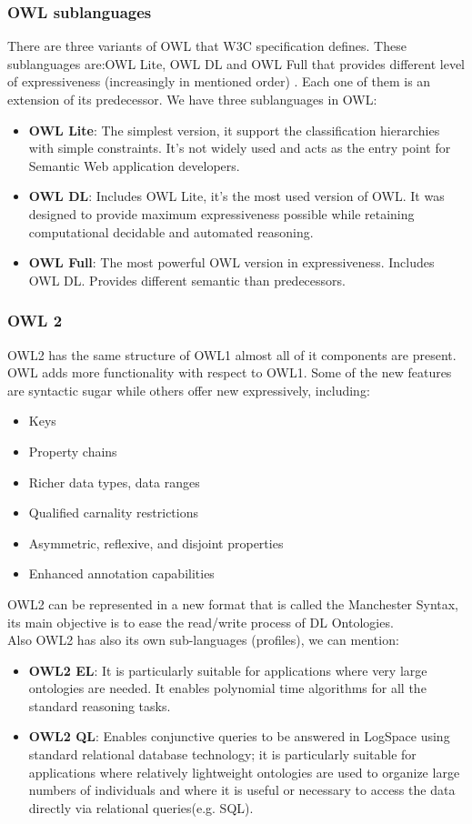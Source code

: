 \subsubsection{OWL sublanguages}
There are three variants of OWL that W3C specification defines. These sublanguages are:OWL Lite, OWL DL and OWL Full that provides different level of expressiveness (increasingly in mentioned order) \cite{semwebp}. Each one of them is an extension of its predecessor. 
We have three sublanguages in OWL: \begin{itemize}
\item  \textbf{OWL Lite}: The simplest version, it support the classification hierarchies with simple constraints. It's not widely used  and acts as the entry point for Semantic Web application developers.
\item  \textbf{OWL DL}: Includes OWL Lite, it's the most used version of OWL. It was designed to provide maximum expressiveness possible while retaining computational decidable and automated reasoning.
\item  \textbf{OWL Full}: The most powerful OWL version in expressiveness. Includes OWL DL. Provides different semantic than predecessors.
\end{itemize}
\subsubsection{OWL 2}
OWL2 \cite{OWL2} has the same structure of OWL1 almost all of it components are present. OWL adds more functionality with respect to OWL1. Some of the new features are syntactic sugar while others offer new expressively, including:\begin{itemize}
\item Keys
\item Property chains
\item Richer data types, data ranges
\item Qualified carnality restrictions
\item Asymmetric, reflexive, and disjoint properties
\item Enhanced annotation capabilities 
\end{itemize}

OWL2 can be represented in a new format that is called the Manchester Syntax, its main objective is to ease the read/write process of DL Ontologies.\\
Also OWL2 has also its own sub-languages (profiles), we can mention:
\begin{itemize}
\item \textbf{OWL2 EL}: It is particularly suitable for applications where very large ontologies are needed. It enables polynomial time algorithms for all the standard reasoning tasks.
\item  \textbf{OWL2 QL}: Enables conjunctive queries to be answered in LogSpace using standard relational database technology; it is particularly suitable for applications where relatively lightweight ontologies are used to organize large numbers of individuals and where it is useful or necessary to access the data directly via relational queries(e.g. SQL).
\end{itemize}
